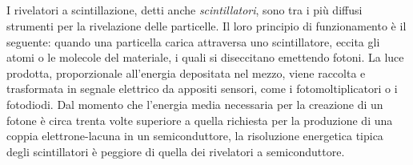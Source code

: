 

\subsection{}





I rivelatori a scintillazione, detti anche \emph{scintillatori}, sono tra i più diffusi strumenti per la rivelazione delle particelle.
Il loro principio di funzionamento è il seguente: quando una particella carica attraversa uno scintillatore, eccita gli atomi o le molecole del materiale, i quali si diseccitano emettendo fotoni. 
La luce prodotta, proporzionale all'energia depositata nel mezzo, viene raccolta e trasformata in segnale elettrico da appositi sensori, come i fotomoltiplicatori o i fotodiodi.
Dal momento che l'energia media necessaria per la creazione di un fotone è circa trenta volte superiore a quella richiesta per la produzione di una coppia elettrone-lacuna in un semiconduttore, la risoluzione energetica tipica degli scintillatori è peggiore di quella dei rivelatori a semiconduttore.

